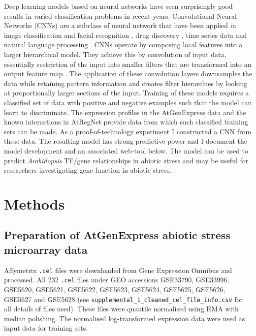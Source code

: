 \documentclass[12pt,a4paper,]{article}
\begin{document}
Deep learning models based on neural networks have seen surprisingly good results in varied classification problems in recent years. Convolutional Neural Networks (CNNs) are a subclass of neural network that have been applied in image classification and facial recognition \citep[\citet{lawrence1997}]{krizhevsky2012}, drug discovery \citep{wallach2015}, time series data \citep{pyrkov2018} and natural language processing \citep{collobert2008}. CNNs operate by composing local features into a larger hierarchical model. They achieve this by convolution of input data, essentially restriction of the input into smaller filters that are transformed into an output feature map \citep{lawrence1997}. The application of these convolution layers downsamples the data while retaining pattern information and creates filter hierarchies by looking at proportionally larger sections of the input. Training of these models requires a classified set of data with positive and negative examples such that the model can learn to discriminate. The expression profiles in the AtGenExpress data and the known interactions in AtRegNet provide data from which such classified training sets can be made. As a proof-of-technology experiment I constructed a CNN from these data. The resulting model has strong predictive power and I document the model development and an associated web-tool below. The model can be used to predict \emph{Arabidopsis} TF/gene relationships in abiotic stress and may be useful for researchers investigating gene function in abiotic stress.

\hypertarget{methods}{%
\section{Methods}\label{methods}}

\hypertarget{preparation-of-atgenexpress-abiotic-stress-microarray-data}{%
\subsection{Preparation of AtGenExpress abiotic stress microarray data}\label{preparation-of-atgenexpress-abiotic-stress-microarray-data}}

Affymetrix \texttt{.cel} files were downloaded from Gene Expression Omnibus and processed. All 232 \texttt{.cel} files under GEO accessions GSE33790, GSE33996, GSE5620, GSE5621, GSE5622, GSE5623, GSE5624, GSE5625, GSE5626, GSE5627 and GSE5628 (see \texttt{supplemental\_1\_cleaned\_cel\_file\_info.csv} for all details of files used). These files were quantile normalised using RMA \citep{Irizarry2003} with median polishing. The normalised log-transformed expression data were used as input data for training sets.
\end{document}
